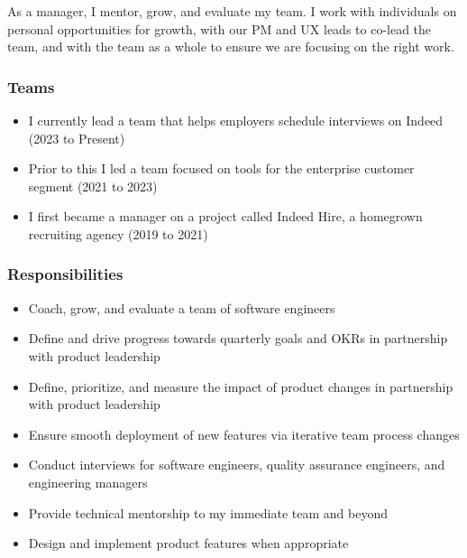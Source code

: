 \documentclass[11pt]{amsart}
\begin{document}
% 
%
\begin{tcolorbox}[
	title=Software Engineering Manager \textcolor{DarkGray}{/} Indeed,
	after title={\hfill2019 \textcolor{DarkGray}{$\rightarrow$} Present \textcolor{DarkGray}{(7 years)}}
]

As a manager, I mentor, grow, and evaluate my team. I work with individuals on personal opportunities for growth, with our PM and UX leads to co-lead the team, and with the team as a whole to ensure we are focusing on the right work.

\subsubsection{Teams}

\begin{itemize}[noitemsep, leftmargin=2em, label=\raisebox{0.25ex}{\tiny$\bullet$}]
	\item I currently lead a team that helps employers schedule interviews on Indeed (2023 to Present)
	\item Prior to this I led a team focused on tools for the enterprise customer segment (2021 to 2023)
	\item I first became a manager on a project called Indeed Hire, a homegrown recruiting agency (2019 to 2021)
\end{itemize}

\subsubsection{Responsibilities}

\begin{itemize}[noitemsep, leftmargin=2em, label=\raisebox{0.25ex}{\tiny$\bullet$}]
	\item Coach, grow, and evaluate a team of software engineers
	\item Define and drive progress towards quarterly goals and \textsc{OKR}s in partnership with product leadership
	\item Define, prioritize, and measure the impact of product changes in partnership with product leadership
	\item Ensure smooth deployment of new features via iterative team process changes
	\item Conduct interviews for software engineers, quality assurance engineers, and engineering managers
	\item Provide technical mentorship to my immediate team and beyond
	\item Design and implement product features when appropriate
\end{itemize}


\end{tcolorbox}
\end{document}
